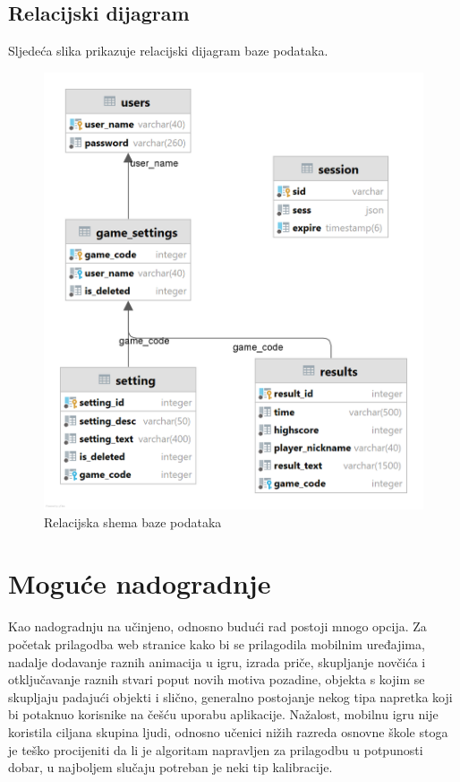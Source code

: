 \documentclass[times, utf8, zavrsni, numeric]{fer}
\begin{document}
	\newpage
	\section{Relacijski dijagram}
		Sljedeća slika prikazuje relacijski dijagram baze podataka.
		\begin{figure}[H]
			\includegraphics[width=\linewidth]{"slike/REL.png"} 
			\centering
			\caption{Relacijska shema baze podataka}
			\label{fig:relshema}
		\end{figure}


\chapter{Moguće nadogradnje}
Kao nadogradnju na učinjeno, odnosno budući rad postoji mnogo opcija. Za početak prilagodba web stranice kako bi se prilagodila mobilnim uređajima, nadalje dodavanje raznih animacija u igru, izrada priče, skupljanje novčića
i otključavanje raznih stvari poput novih motiva pozadine, objekta s kojim se skupljaju padajući objekti i slično, generalno postojanje nekog tipa napretka koji bi potaknuo korisnike na češću uporabu aplikacije.
Nažalost, mobilnu igru nije koristila ciljana skupina ljudi, odnosno učenici nižih razreda osnovne škole stoga je teško procijeniti da li je algoritam napravljen za prilagodbu u potpunosti dobar, u najboljem slučaju potreban
je neki tip kalibracije. 
\end{document}
